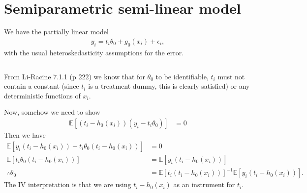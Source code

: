 \documentclass[12pt]{article}
\newcommand{\E}{\mathbb{E}}
\newcommand{\e}{\epsilon}
\newcommand{\mtx}[1]{\ensuremath{\bm{\mathit{#1}}}}
\begin{document}
\newpage

\section{Semiparametric semi-linear model}
We have the partially linear model
\begin{align}
y_i = t_i \theta_0 + g_0(\mtx{x_i}) + \e_i, \label{eq:3a}
\end{align}
with the usual heteroskedasticity assumptions for the error.
\subsection{}
From Li-Racine 7.1.1 (p 222) we know that for $\theta_0$ to be identifiable, $t_i$ must not contain a constant (since $t_i$ is a treatment dummy, this is clearly satisfied) or any deterministic functions of $\mtx{x}_i$. 

Now, somehow we need to show
\begin{align*}
\E[(t_i-h_0(\mtx{x}_i))(y_i - t_i\theta_0)]&=0
\end{align*}
Then we have
\begin{align*}
\E[y_i (t_i-h_0(\mtx{x}_i))- t_i\theta_0(t_i-h_0(\mtx{x}_i))]&=0\\
\E[t_i\theta_0(t_i-h_0(\mtx{x}_i))] &= \E[y_i (t_i-h_0(\mtx{x}_i))]\\
\therefore \theta_0 &= \E[t_i(t_i-h_0(\mtx{x}_i))]^{-1}\E[y_i (t_i-h_0(\mtx{x}_i))].
\end{align*}
The IV interpretation is that we are using $t_i-h_0(\mtx{x}_i)$ as an instrument for $t_i$.
\end{document}
